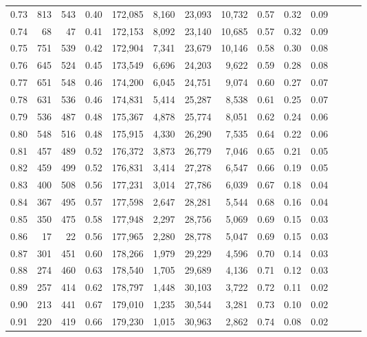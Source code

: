 \begin{tabular}{rrrrrrrrrrrrrr}
0.73 &    813 &  543 &  0.40 &  172,085 &    8,160 &  23,093 &  10,732 &  0.57 &  0.32 &      0.09 \\
0.74 &     68 &   47 &  0.41 &  172,153 &    8,092 &  23,140 &  10,685 &  0.57 &  0.32 &      0.09 \\
0.75 &    751 &  539 &  0.42 &  172,904 &    7,341 &  23,679 &  10,146 &  0.58 &  0.30 &      0.08 \\
0.76 &    645 &  524 &  0.45 &  173,549 &    6,696 &  24,203 &   9,622 &  0.59 &  0.28 &      0.08 \\
0.77 &    651 &  548 &  0.46 &  174,200 &    6,045 &  24,751 &   9,074 &  0.60 &  0.27 &      0.07 \\
0.78 &    631 &  536 &  0.46 &  174,831 &    5,414 &  25,287 &   8,538 &  0.61 &  0.25 &      0.07 \\
0.79 &    536 &  487 &  0.48 &  175,367 &    4,878 &  25,774 &   8,051 &  0.62 &  0.24 &      0.06 \\
0.80 &    548 &  516 &  0.48 &  175,915 &    4,330 &  26,290 &   7,535 &  0.64 &  0.22 &      0.06 \\
0.81 &    457 &  489 &  0.52 &  176,372 &    3,873 &  26,779 &   7,046 &  0.65 &  0.21 &      0.05 \\
0.82 &    459 &  499 &  0.52 &  176,831 &    3,414 &  27,278 &   6,547 &  0.66 &  0.19 &      0.05 \\
0.83 &    400 &  508 &  0.56 &  177,231 &    3,014 &  27,786 &   6,039 &  0.67 &  0.18 &      0.04 \\
0.84 &    367 &  495 &  0.57 &  177,598 &    2,647 &  28,281 &   5,544 &  0.68 &  0.16 &      0.04 \\
0.85 &    350 &  475 &  0.58 &  177,948 &    2,297 &  28,756 &   5,069 &  0.69 &  0.15 &      0.03 \\
0.86 &     17 &   22 &  0.56 &  177,965 &    2,280 &  28,778 &   5,047 &  0.69 &  0.15 &      0.03 \\
0.87 &    301 &  451 &  0.60 &  178,266 &    1,979 &  29,229 &   4,596 &  0.70 &  0.14 &      0.03 \\
0.88 &    274 &  460 &  0.63 &  178,540 &    1,705 &  29,689 &   4,136 &  0.71 &  0.12 &      0.03 \\
0.89 &    257 &  414 &  0.62 &  178,797 &    1,448 &  30,103 &   3,722 &  0.72 &  0.11 &      0.02 \\
0.90 &    213 &  441 &  0.67 &  179,010 &    1,235 &  30,544 &   3,281 &  0.73 &  0.10 &      0.02 \\
0.91 &    220 &  419 &  0.66 &  179,230 &    1,015 &  30,963 &   2,862 &  0.74 &  0.08 &      0.02 \\

\end{tabular}
